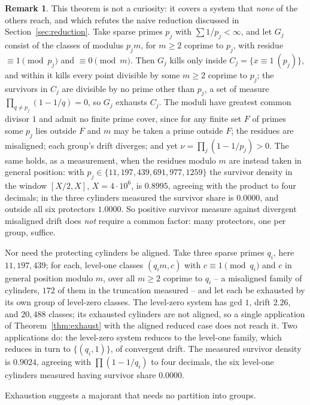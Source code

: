 \documentclass[11pt]{article}
\theoremstyle{plain}
\theoremstyle{definition}
\newtheorem{remark}[theorem]{Remark}
\begin{document}
\begin{remark}\label{rem:manyprot}
This theorem is not a curiosity: it covers a system that
\emph{none} of the others reach, and which refutes the naive
reduction discussed in Section~\ref{sec:reduction}.  Take sparse primes $p_j$ with
$\sum1/p_j<\infty$, and let $G_j$ consist of the classes of
modulus $p_jm$, for $m\ge2$ coprime to $p_j$, with residue
$\equiv1\pmod{p_j}$ and $\equiv0\pmod m$.  Then $G_j$ kills only
inside $C_j=\{x\equiv1\ (p_j)\}$, and within it kills every
point divisible by some $m\ge2$ coprime to $p_j$; the survivors
in $C_j$ are divisible by no prime other than $p_j$, a set of
measure $\prod_{q\ne p_j}(1-1/q)=0$, so $G_j$ exhausts $C_j$.
The moduli have greatest common divisor $1$ and admit no finite
prime cover, since for any finite set $F$ of primes some $p_j$
lies outside $F$ and $m$ may be taken a prime outside $F$; the
residues are misaligned; each group's drift diverges; and yet
$\nu=\prod_j(1-1/p_j)>0$.  The same holds, as a measurement,
when the residues modulo $m$ are instead taken in general
position: with $p_j\in\{11,197,439,691,977,1259\}$ the
survivor density in the window $[X/2,X]$, $X=4\cdot10^6$, is
$0.8995$, agreeing with the product to four decimals; in the
three cylinders measured the survivor share is $0.0000$, and outside
all six protectors $1.0000$.  So positive survivor measure against
divergent misaligned drift does \emph{not} require a common
factor: many protectors, one per group, suffice.

Nor need the protecting cylinders be aligned.  Take three sparse
primes $q_i$, here $11,197,439$; for each, level-one classes $(q_im,c)$ with
$c\equiv1\pmod{q_i}$ and $c$ in general position modulo $m$,
over all $m\ge2$ coprime to $q_i$ -- a misaligned family of
cylinders, $172$ of them in the truncation measured -- and let
each be exhausted by its own group of level-zero classes.  The
level-zero system has gcd $1$, drift $2.26$, and $20{,}488$
classes; its exhausted cylinders are not aligned, so a single
application of Theorem~\ref{thm:exhaust} with the aligned
reduced case does not reach it.  Two applications do: the
level-zero system reduces to the level-one family, which reduces
in turn to $\{(q_i,1)\}$, of convergent drift.  The measured
survivor density is $0.9024$, agreeing with
$\prod(1-1/q_i)$ to four decimals, the six level-one cylinders measured
having survivor share $0.0000$.
\end{remark}

Exhaustion suggests a majorant that needs no partition into
groups.
\end{document}
